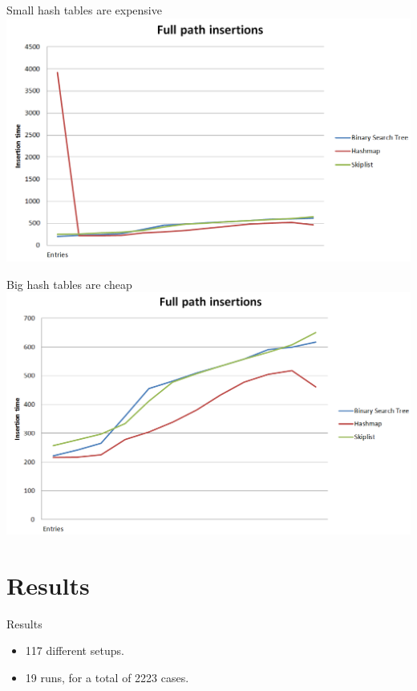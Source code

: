 \documentclass[10pt]{beamer}
\begin{document}
\begin{frame}{Small hash tables are expensive}
    \centering
    \includegraphics[width=\textwidth]{hashtable_bad.png}
\end{frame}

\begin{frame}{Big hash tables are cheap}
    \centering
    \includegraphics[width=\textwidth]{hashtable_good.png}
\end{frame}

\section{Results}

\begin{frame}{Results}
    \begin{itemize}
        \item 117 different setups.
        \item 19 runs, for a total of 2223 cases.
    \end{itemize}
\end{frame}
\end{document}
